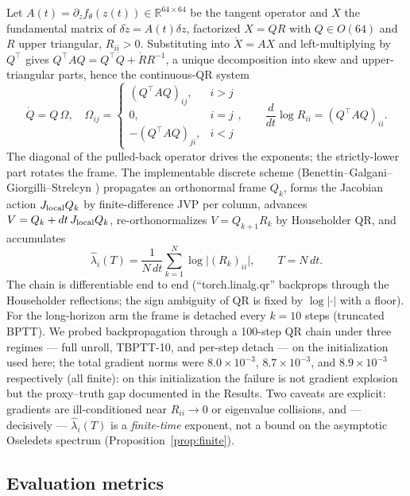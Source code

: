 \documentclass[11pt]{article}
\newcommand{\R}{\mathbb{R}}
\begin{document}
Let $A(t)=\partial_z f_\theta(z(t))\in\R^{64\times64}$ be the tangent
operator and $X$ the fundamental matrix of $\delta\dot z=A(t)\delta z$,
factorized $X=QR$ with $Q\in O(64)$ and $R$ upper triangular,
$R_{ii}>0$. Substituting into $\dot X=AX$ and left-multiplying by
$Q^\top$ gives $Q^\top A Q = Q^\top\dot Q + \dot R R^{-1}$, a unique
decomposition into skew and upper-triangular parts, hence the
continuous-QR system
\begin{equation}
  \dot Q = Q\,\Omega,\quad \Omega_{ij}=
  \begin{cases}(Q^\top A Q)_{ij},& i>j\\0,& i=j\\
  -(Q^\top A Q)_{ji},& i<j\end{cases},\qquad
  \frac{d}{dt}\log R_{ii}=(Q^\top A Q)_{ii}.
\end{equation}
The diagonal of the pulled-back operator drives the exponents; the
strictly-lower part rotates the frame. The implementable discrete
scheme (Benettin--Galgani--Giorgilli--Strelcyn \cite{benettin1980lyapunov})
propagates an orthonormal frame $Q_k$, forms the Jacobian action
$J_{\rm local}Q_k$ by finite-difference JVP per column, advances
$V=Q_k+dt\,J_{\rm local}Q_k$, re-orthonormalizes $V=Q_{k+1}R_k$ by
Householder QR, and accumulates
\begin{equation}
  \hat\lambda_i(T)=\frac{1}{N\,dt}\sum_{k=1}^{N}\log\big|(R_k)_{ii}\big|,
  \qquad T=N\,dt.
\end{equation}
The chain is differentiable end to end (``torch.linalg.qr'' backprops
through the Householder reflections; the sign ambiguity of QR is fixed by
$\log|\cdot|$ with a floor). For the long-horizon arm the frame is
detached every $k=10$ steps (truncated BPTT). We probed backpropagation
through a 100-step QR chain under three regimes --- full unroll,
TBPTT-10, and per-step detach --- on the initialization used here; the
total gradient norms were $8.0\times10^{-3}$, $8.7\times10^{-3}$, and
$8.9\times10^{-3}$ respectively (all finite): on this initialization the
failure is not gradient explosion but the proxy--truth gap documented in
the Results. Two caveats are explicit: gradients are ill-conditioned
near $R_{ii}\to0$ or eigenvalue collisions, and --- decisively ---
$\hat\lambda_i(T)$ is a \emph{finite-time} exponent, not a bound on the
asymptotic Oseledets spectrum (Proposition~\ref{prop:finite}).

\subsection{Evaluation metrics}
\label{sec:methods-eval}
\end{document}
